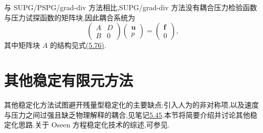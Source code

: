 \begin{note}\label{note:oseen-sg-implementation}
与 SUPG/PSPG/grad-div 方法相比,SUPG/grad-div 方法没有耦合压力检验函数与压力试探函数的矩阵块,因此耦合系统为
\[
 \begin{pmatrix}A&D\\B&0\end{pmatrix}
 \begin{pmatrix}\bm{u}\\p\end{pmatrix}
 =\begin{pmatrix}\bm{f}\\0\end{pmatrix},
\]
其中矩阵块 $A$ 的结构见式\hyperref[eq:oseen-spg-implementation-velocity-block]{(5.76)}.
\end{note}

\section{其他稳定有限元方法}\label{sec:oseen-other-stabilization-methods}

\begin{note}[动机]\label{note:oseen-other-stabilization-motivation}
其他稳定化方法试图避开残量型稳定化的主要缺点:引入人为的非对称项,以及速度与压力之间过强且缺乏物理解释的耦合,见笔记\hyperref[note:oseen-spg-concluding-remarks]{5.45}.本节将简要介绍并讨论其他稳定化思路.关于 Oseen 方程稳定化技术的综述,可参见\textcite{BraackBurmanJohnLube2007}.
\end{note}

